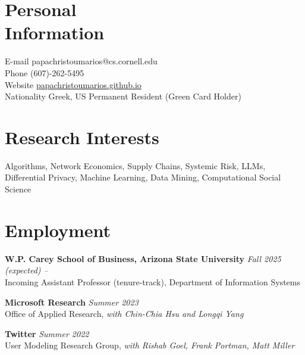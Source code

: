 \documentclass[margin]{res}
\newcommand{\field}[2]{\noindent \textbf{#1} \hfill #2 \\}
\newcommand{\specialurl}[2]{\href {#2} {{{[#1]}}}}
\begin{document}

\begin{resume}

\section{Personal \\ Information} 
E-mail \hfill papachristoumarios@cs.cornell.edu \\
Phone \hfill (607)-262-5495 \\
Website \hfill \href{https://papachristoumarios.github.io}{{papachristoumarios.github.io}} \\
Nationality \hfill Greek, US Permanent Resident (Green Card Holder)
  

\section{Research Interests} Algorithms, Network Economics, Supply Chains, Systemic Risk, LLMs, Differential Privacy, Machine Learning, Data Mining, Computational Social Science


\section{Employment}

\field{W.P. Carey School of Business, Arizona State University}{\emph{Fall 2025 (expected) --}}{Incoming Assistant Professor (tenure-track), Department of Information Systems} 

\field{Microsoft Research}{\emph{Summer 2023}}{Office of Applied Research, \emph{with Chin-Chia Hsu and Longqi Yang}}

\field{Twitter}{\emph{Summer 2022}}{User Modeling Research Group, \emph{with Rishab Goel, Frank Portman, Matt Miller}}



\end{resume}
\end{document}
